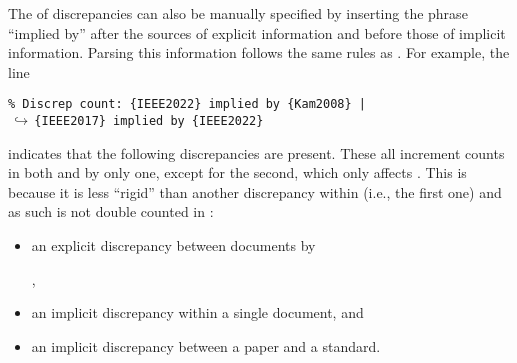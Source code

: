 The  of discrepancies can also be manually specified by
inserting the phrase ``implied by'' after the sources of explicit information
and before those of implicit information. Parsing this information follows the
same rules as . For example, the line

\begin{displayquote}
    \texttt{\% Discrep count: \{IEEE2022\} implied by \{Kam2008\} |\\
        $\,\hookrightarrow\,$\quad \{IEEE2017\} implied by \{IEEE2022\}}
\end{displayquote}

indicates that the following discrepancies are present. These all increment
counts in both  and  by only one,
except for the second, which only affects . This is
because it is less ``rigid'' than another discrepancy within \stds{} (i.e., the
first one) and as such is not double counted in :

\begin{itemize}
    \item an explicit discrepancy between documents by
          \begin{NoHyper}\citeauthor{IEEE2022}\end{NoHyper},
    \item an implicit discrepancy within a single document, and
    \item an implicit discrepancy between a paper and a standard.
\end{itemize}
